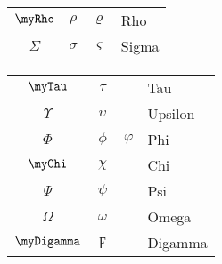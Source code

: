 \begin{multicols}{4}
\begin{tabular}{|ccc|p{\anonlength}|}
        $\myRho     $ & $\rho      $ & $\varrho    $ & Rho      \\
        $\Sigma     $ & $\sigma    $ & $\varsigma  $ & Sigma    \\
        \hline
    \end{tabular}
    \begin{tabular}{|ccc|p{\anonlength}|}
        \hline
        $\myTau     $ & $\tau      $ &               & Tau      \\
        $\Upsilon   $ & $\upsilon  $ &               & Upsilon  \\
        $\Phi       $ & $\phi      $ & $\varphi    $ & Phi      \\
        $\myChi     $ & $\chi      $ &               & Chi      \\
        $\Psi       $ & $\psi      $ &               & Psi      \\
        $\Omega     $ & $\omega    $ &               & Omega    \\
        \hline
        \hline
        $\myDigamma $ & $\digamma  $ &               & Digamma  \\
        \hline
    \end{tabular}
\end{multicols}

